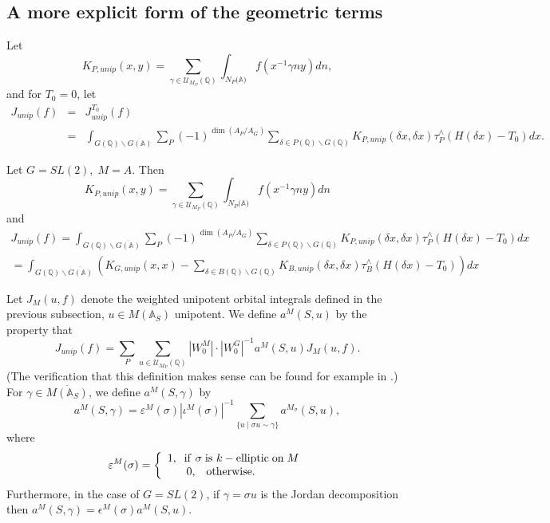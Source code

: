 \subsection{A more explicit form of the geometric terms}\label{ssec:explicit}

\begin{definition}\label{defn:4.12}
Let 
\[
K_{P,unip}(x,y)
=\sum_{\gamma \in {\mathcal U}_{M_P}{\mathbb {(Q)}}}
\int_{N_P({\mathbb {A})}}f(x^{-1}\gamma ny)dn,
\]
and for $T_0=0$, let 
\begin{eqnarray*}
J_{unip}(f)
&=&J_{unip}^{T_0}(f) \\
&=&\int_{G({\mathbb{Q}})\backslash \overline{G({\mathbb{A}})}}
\sum_P(-1)^{\dim(A_P/A_G)}
\sum_{\delta \in P({\mathbb {Q}})\backslash G({\mathbb{Q}})}
K_{P,unip}(\delta x,\delta x)
\tau _P^{\wedge }(H(\delta x)-T_0)dx.
\end{eqnarray*}
\end{definition}

\begin{example}\label{ex:4.13}
Let $G=SL(2),\;M=A$. Then 
\[
K_{P,unip}(x,y)
=\sum_{\gamma \in {\mathcal U}_{M_P}({\mathbb {Q}})}
\int_{N_P({\mathbb {A})}}f(x^{-1}\gamma ny)dn
\]
and 
\begin{eqnarray*}
J_{unip}(f)
=\int_{G({\mathbb {Q}})\backslash \overline{G({\mathbb{A}})}}
\sum_P(-1)^{\dim(A_P/A_G)}
\sum_{\delta \in P({\mathbb {Q}})\backslash G({\mathbb{Q}})}
K_{P,unip}(\delta x,\delta x)
\tau _P^{\wedge }(H(\delta x)-T_0)dx \\
=\int_{G({\mathbb{Q}})\backslash \overline{G({\mathbb{A}})}}
(K_{G,unip}(x,x)-
\sum_{\delta \in B({\mathbb {Q}})\backslash G({\mathbb{Q}})}
K_{B,unip}(\delta x,\delta x)
\tau _B^{\wedge }(H(\delta x)-T_0))dx
\end{eqnarray*}
\end{example}

\begin{definition}\label{defn:4.14}
Let $J_M(u,f)$ denote the weighted unipotent orbital integrals defined in
the previous subsection,
$u\in M({\mathbb A}_S)$ unipotent.
We define $a^M(S,u)$ by the property that 
\[
J_{unip}(f)
=\sum_P
\sum_{u\in {\mathcal U}_{M_P}({\mathbb {Q}})}
|W_0^M|\cdot |W_0^G|^{-1}a^M(S,u)J_M(u,f).
\]
(The verification that this definition makes sense can be found
for example in \cite[section 6.2, pp.~66--67]{Sho}.) For
$\gamma\in \overline{M({\mathbb A}_S)}$, we define $a^M(S,\gamma )$ by 
\[
a^M(S,\gamma )
=\varepsilon ^M(\sigma )|\iota ^M(\sigma)|^{-1}
\sum_{\{u\;|\;\sigma u\sim \gamma \}}a^{M_\sigma }(S,u),
\]
where 
\[
\varepsilon ^M(\sigma )=\left\{ 
\begin{array}{c}
1,\;\;{\rm if}\ \sigma \;{\rm is\ }k-{\rm elliptic\;on}\;M \\ 
0,\;\;\;{\rm otherwise}.\;\;\;\;\;\;\;\;
\end{array}
\right. 
\]
Furthermore, in the case of $G=SL(2)$, if $\gamma =\sigma u$
is the Jordan decomposition then
$a^M(S,\gamma)=\epsilon^M(\sigma)a^M(S,u)$.
\end{definition}


